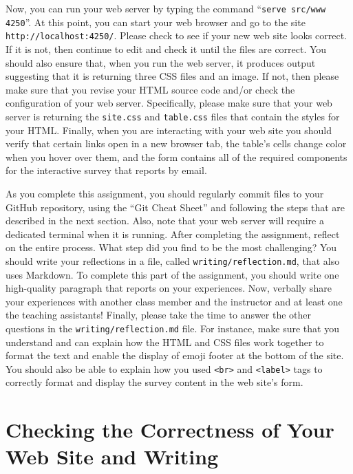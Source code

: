 \documentclass[11pt]{article}
\newcommand{\reflection}{\lstinline{writing/reflection.md}}
\newcommand{\command}[1]{``\lstinline{#1}''}
\newcommand{\program}[1]{\lstinline{#1}}
\newcommand{\url}[1]{\lstinline{#1}}
\begin{document}
Now, you can run your web server by typing the command \command{serve src/www
4250}. At this point, you can start your web browser and go to the site
\url{http://localhost:4250/}. Please check to see if your new web site looks
correct. If it is not, then continue to edit and check it until the files are
correct. You should also ensure that, when you run the web server, it produces
output suggesting that it is returning three CSS files and an image. If not,
then please make sure that you revise your HTML source code and/or check the
configuration of your web server. Specifically, please make sure that your web
server is returning the \program{site.css} and \program{table.css} files that
contain the styles for your HTML. Finally, when you are interacting with your
web site you should verify that certain links open in a new browser tab, the
table's cells change color when you hover over them, and the form contains all
of the required components for the interactive survey that reports by email.


As you complete this assignment, you should regularly commit files to your
GitHub repository, using the ``Git Cheat Sheet'' and following the steps that
are described in the next section. Also, note that your web server will require
a dedicated terminal when it is running. After completing the assignment,
reflect on the entire process. What step did you find to be the most
challenging? You should write your reflections in a file, called \reflection{},
that also uses Markdown. To complete this part of the assignment, you should
write one high-quality paragraph that reports on your experiences. Now, verbally
share your experiences with another class member and the instructor and at least
one the teaching assistants! Finally, please take the time to answer the other
questions in the \reflection{} file. For instance, make sure that you understand
and can explain how the HTML and CSS files work together to format the text and
enable the display of emoji footer at the bottom of the site. You should also be
able to explain how you used \program{<br>} and \program{<label>} tags to
correctly format and display the survey content in the web site's form.

\section*{Checking the Correctness of Your Web Site and Writing}
\end{document}
